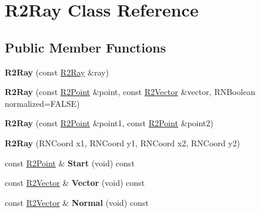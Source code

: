 \hypertarget{class_r2_ray}{}\section{R2\+Ray Class Reference}
\label{class_r2_ray}
\subsection*{Public Member Functions}
\begin{DoxyCompactItemize}
\item 
{\bfseries R2\+Ray} (const \hyperlink{class_r2_ray}{R2\+Ray} \&ray)\hypertarget{class_r2_ray_a058a2f31541438ddcad2bb3586bb4b20}{}\label{class_r2_ray_a058a2f31541438ddcad2bb3586bb4b20}

\item 
{\bfseries R2\+Ray} (const \hyperlink{class_r2_point}{R2\+Point} \&point, const \hyperlink{class_r2_vector}{R2\+Vector} \&vector, R\+N\+Boolean normalized=F\+A\+L\+SE)\hypertarget{class_r2_ray_abff370d39ddda85006602199ad4033d6}{}\label{class_r2_ray_abff370d39ddda85006602199ad4033d6}

\item 
{\bfseries R2\+Ray} (const \hyperlink{class_r2_point}{R2\+Point} \&point1, const \hyperlink{class_r2_point}{R2\+Point} \&point2)\hypertarget{class_r2_ray_a5472afded08f4283164eac015ee9b7e3}{}\label{class_r2_ray_a5472afded08f4283164eac015ee9b7e3}

\item 
{\bfseries R2\+Ray} (R\+N\+Coord x1, R\+N\+Coord y1, R\+N\+Coord x2, R\+N\+Coord y2)\hypertarget{class_r2_ray_a14c6f626289e0a90ef2ce8a610ad0594}{}\label{class_r2_ray_a14c6f626289e0a90ef2ce8a610ad0594}

\item 
const \hyperlink{class_r2_point}{R2\+Point} \& {\bfseries Start} (void) const \hypertarget{class_r2_ray_a3d849aadfe78f5b2171983ea8a7ca20c}{}\label{class_r2_ray_a3d849aadfe78f5b2171983ea8a7ca20c}

\item 
const \hyperlink{class_r2_vector}{R2\+Vector} \& {\bfseries Vector} (void) const \hypertarget{class_r2_ray_a17985c2e7bf0d3fc9aa6ac18e6635197}{}\label{class_r2_ray_a17985c2e7bf0d3fc9aa6ac18e6635197}

\item 
const \hyperlink{class_r2_vector}{R2\+Vector} \& {\bfseries Normal} (void) const \hypertarget{class_r2_ray_a0fea465f805485d94744ca81405a82a8}{}\label{class_r2_ray_a0fea465f805485d94744ca81405a82a8}


\end{DoxyCompactItemize}
